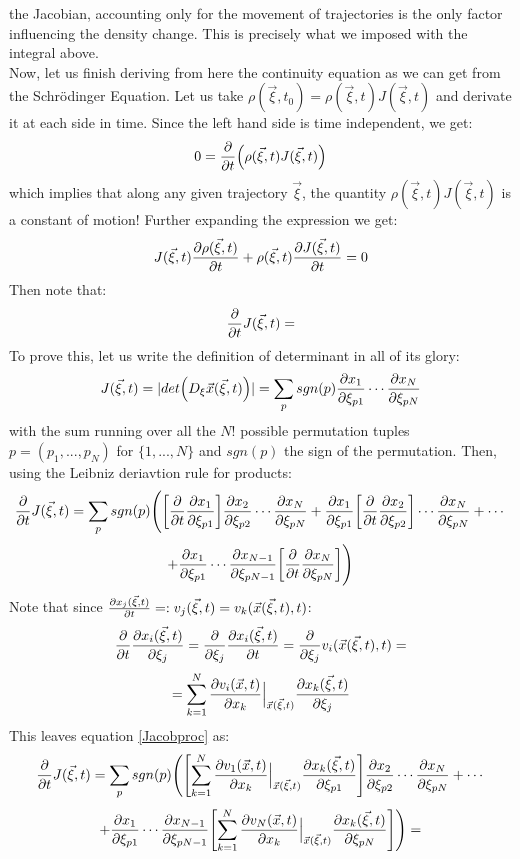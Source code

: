 \documentclass[11pt, a4paper]{article} %
\DeclareRobustCommand{\mybox}[2][gray!20]{%
\begin{tcolorbox}[   %
        left=1cm,
        right=1cm,
        top=0.5cm,
        bottom=0.5cm,
        colback=#1,
        colframe=#1,
        width=\dimexpr\textwidth\relax, 
        enlarge left by=0mm,
        boxsep=5pt,
        arc=0pt,outer arc=0pt,
        ]
        #2
\end{tcolorbox}
}
\begin{document}
\mybox{ the Jacobian, accounting only for the movement of trajectories is the only factor influencing the density change. This is precisely what we imposed with the integral above.\\

Now, let us finish deriving from here the continuity equation as we can get from the Schrödinger Equation. Let us take $\rho(\vec{\xi},t_0) = \rho(\vec{\xi},t) J(\vec{\xi},t)$ and derivate it at each side in time. Since the left hand side is time independent, we get:
\begin{equation}
0=\pdv{}{t}\qty( \rho(\vec{\xi},t) J(\vec{\xi},t))
\end{equation}
which implies that along any given trajectory $\vec{\xi}$, the quantity $\rho(\vec{\xi},t) J(\vec{\xi},t)$ is a constant of motion! Further expanding the expression we get:
\begin{equation}\label{Jacobproc0}
J(\vec{\xi},t)\pdv{\rho(\vec{\xi},t)}{t}+\rho(\vec{\xi},t)\pdv{J(\vec{\xi},t)}{t}=0
\end{equation}
Then note that:
\begin{equation}
\pdv{}{t}J(\vec{\xi},t)=
\end{equation}
To prove this, let us write the definition of determinant in all of its glory:
\begin{equation}
J(\vec{\xi},t)=|det \Big( D_\xi \vec{x}(\vec{\xi},t) \Big)|=\sum_p sgn(p) \pdv{x_1}{\xi_{p1}} \cdots \pdv{x_N}{\xi_{pN}}
\end{equation}
with the sum running over all the $N!$ possible permutation tuples $p=(p_1,...,p_N)$ for $\{1,...,N\}$ and $sgn(p)$ the sign of the permutation. Then, using the Leibniz deriavtion rule for products:
\begin{equation}\label{Jacobproc}
\pdv{}{t}J(\vec{\xi},t)=\sum_p sgn(p) \Bigg(\qty[\pdv{}{t}\pdv{x_1}{\xi_{p1}}]\pdv{x_2}{\xi_{p2}} \cdots \pdv{x_N}{\xi_{pN}}+\pdv{x_1}{\xi_{p1}}\qty[\pdv{}{t}\pdv{x_2}{\xi_{p2}}] \cdots \pdv{x_N}{\xi_{pN}}+\cdots
\end{equation}
$$
+\pdv{x_1}{\xi_{p1}} \cdots \pdv{x_{N-1}}{\xi_{pN-1}}\qty[\pdv{}{t}\pdv{x_N}{\xi_{pN}}]\Bigg)
$$
Note that since $\pdv{x_j(\vec{\xi},t)}{t}=:v_j(\vec{\xi},t)=v_k(\vec{x}(\vec{\xi},t),t)$:
\begin{equation}
\pdv{}{t}\pdv{x_i(\vec{\xi},t)}{\xi_j}=\pdv{}{\xi_j}\pdv{x_i(\vec{\xi},t)}{t}=\pdv{}{\xi_j}v_i(\vec{x}(\vec{\xi},t),t)=
\end{equation}
$$
=\sum_{k=1}^N \pdv{v_i(\vec{x},t)}{x_k}\Big\rvert_{\vec{x}(\vec{\xi},t)}\pdv{x_k(\vec{\xi},t)}{\xi_j}
$$
This leaves equation \eqref{Jacobproc} as:
\begin{equation}
\pdv{}{t}J(\vec{\xi},t)=\sum_p sgn(p) \Bigg(\qty[\sum_{k=1}^N \pdv{v_1(\vec{x},t)}{x_k}\Big\rvert_{\vec{x}(\vec{\xi},t)}\pdv{x_k(\vec{\xi},t)}{\xi_{p1}}]\pdv{x_2}{\xi_{p2}} \cdots \pdv{x_N}{\xi_{pN}}+\cdots
\end{equation}
$$
+\pdv{x_1}{\xi_{p1}} \cdots \pdv{x_{N-1}}{\xi_{pN-1}}\qty[\sum_{k=1}^N \pdv{v_N(\vec{x},t)}{x_k}\Big\rvert_{\vec{x}(\vec{\xi},t)}\pdv{x_k(\vec{\xi},t)}{\xi_{pN}}]\Bigg)=
$$
}
\end{document}
